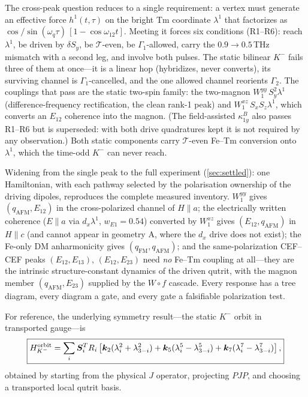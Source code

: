 \documentclass[11pt,a4paper]{article}
\newcommand{\ve}[1]{\boldsymbol{#1}}
\begin{document}

The cross-peak question reduces to a single requirement: a vertex must generate
an effective force $h^1(t,\tau)$ on the bright Tm coordinate $\lambda^1$ that
factorizes as $\cos/\sin(\omega_q\tau)\,[1-\cos\omega_{12}t]$.  Meeting it forces
six conditions (R1--R6): reach $\lambda^1$, be driven by $\delta S_y$, be
$\mathcal T$-even, be $\Gamma_1$-allowed, carry the $0.9\!\to\!0.5\,$THz mismatch
with a second leg, and involve both pulses.  The static bilinear $K^-$ fails
three of them at once---it is a linear hop (hybridizes, never converts), its
surviving channel is $\Gamma_1$-cancelled, and the one allowed channel reorients
$\Gamma_2$.  The couplings that pass are the static two-spin family:
the two-magnon $W^{yy}_1\,S_y^2\lambda^1$ (difference-frequency
rectification, the clean rank-1 peak) and $W^{xz}_1\,S_xS_z\lambda^1$,
which converts an $E_{12}$ coherence into the magnon.  (The
field-assisted $\kappa^B_{1y}$ also passes R1--R6 but is superseded:
with both drive quadratures kept it is not required by any
observation.)  Both static components carry $\mathcal T$-even Fe--Tm
conversion onto $\lambda^1$, which the time-odd $K^-$ can never reach.

Widening from the single peak to the full experiment
(\cref{sec:settled}): one Hamiltonian, with each pathway selected by
the polarisation ownership of the driving dipoles, reproduces the
complete measured inventory.  $W^{yy}_1$ gives
$(q_{\mathrm{AFM}},E_{12})$ in the cross-polarized channel of
$H\!\parallel\!a$; the electrically written coherence
($E\!\parallel\!a$ via $d_x\lambda^1$, $w_{E1}=0.54$) converted by
$W^{xz}_1$ gives $(E_{12},q_{\mathrm{AFM}})$ in $H\!\parallel\!c$
(and cannot appear in geometry A, where the $d_x$ drive does not
exist); the Fe-only DM anharmonicity gives
$(q_{\mathrm{FM}},q_{\mathrm{AFM}})$; and the same-polarization CEF--CEF peaks
$(E_{12},E_{13})$, $(E_{12},E_{23})$ need \emph{no} Fe--Tm coupling at
all---they are the intrinsic structure-constant dynamics of the driven qutrit,
with the magnon member $(q_{\mathrm{AFM}},E_{23})$ supplied by the
$W\!\circ\!f$ cascade.  Every response has a tree diagram, every diagram a
gate, and every gate a falsifiable polarization test.

For reference, the underlying symmetry result---the static $K^-$ orbit in
transported gauge---is
\begin{equation}
  \boxed{
  H_{K^-}^{\rm orbit}
  =\sum_i\ve S_i^TR_i
  \left[\ve k_2(\lambda_i^2+\lambda_{3-i}^2)
  +\ve k_5(\lambda_i^5-\lambda_{3-i}^5)
  +\ve k_7(\lambda_i^7-\lambda_{3-i}^7)\right],}
\end{equation}
obtained by starting from the physical $J$ operator, projecting $PJP$, and
choosing a transported local qutrit basis.
\end{document}
